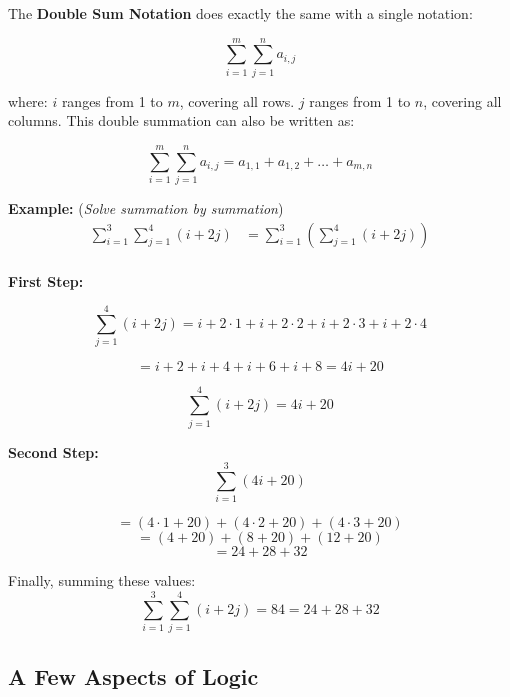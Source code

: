 \documentclass{article}
\begin{document}
The \textbf{Double Sum Notation} does exactly the same with a single notation: 

\[
\sum_{i=1}^m \sum_{j=1}^n a_{i,j}
\]

where:
\(i\) ranges from 1 to \(m\), covering all rows.
\(j\) ranges from 1 to \(n\), covering all columns. This double summation can also be written as:

\[
\sum_{i=1}^m \sum_{j=1}^n a_{i,j} = a_{1,1} + a_{1,2} + \dots + a_{m,n}
\]

\textbf{Example: }(\textit{Solve summation by summation})
\begin{align*}
\sum_{i=1}^{3} \sum_{j=1}^{4} (i + 2j) &= \sum_{i=1}^{3} \left( \sum_{j=1}^{4} (i + 2j) \right) \\
\end{align*}

\textbf{First Step:}

\[
\sum_{j=1}^{4} (i + 2j) = i + 2 \cdot 1 + i + 2 \cdot 2 + i + 2 \cdot 3 + i + 2 \cdot 4
\]

\[
= i + 2 + i + 4 + i + 6 + i + 8 = 4i + 20
\]

\[
\sum_{j=1}^{4} (i + 2j) = 4i + 20
\]

\textbf{Second Step:}
\[
\sum_{i=1}^{3} (4i + 20)
\]

\[
= (4 \cdot 1 + 20) + (4 \cdot 2 + 20) + (4 \cdot 3 + 20)
\]
\[
= (4 + 20) + (8 + 20) + (12 + 20)
\]
\[
= 24 + 28 + 32
\]

Finally, summing these values:
\[
\sum_{i=1}^{3} \sum_{j=1}^{4} (i + 2j) = 84 = 24 + 28 + 32 
\]

\subsection{A Few Aspects of Logic}
 
\end{document}
